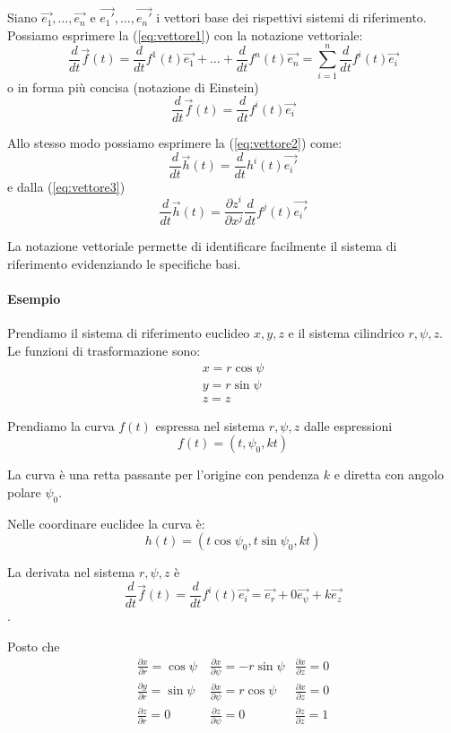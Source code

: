 \documentclass[a4paper,11pt]{article}
\begin{document}
Siano $ \vec {e_1}, \dots , \vec {e_n} $ e $ \vec {e_1'}, \dots , \vec {e_n'} $ i vettori base
dei rispettivi sistemi di riferimento. Possiamo esprimere la (\ref{eq:vettore1})
con la notazione vettoriale:
\[ \frac{d}{dt} \vec f(t) = \frac{d}{dt} f^1(t) \vec {e_1} + \dots + \frac{d}{dt} f^n(t) \vec {e_n} = \sum_{i=1}^n \frac{d}{dt} f^i(t) \vec {e_i}\]
o in forma più concisa (notazione di Einstein)
\[ \frac{d}{dt} \vec f(t) = \frac{d}{dt} f^i(t) \vec {e_i} \]

Allo stesso modo possiamo esprimere la (\ref{eq:vettore2}) come:
\[ \frac{d}{dt} \vec h(t) = \frac{d}{dt} h^i(t) \vec {e_i'} \]
e dalla (\ref{eq:vettore3})
\[ \frac{d}{dt} \vec h(t) = \frac{\partial z^i}{\partial x^j} \frac{d}{dt} f^j(t) \vec {e_i'} \]

La notazione vettoriale permette di identificare facilmente il sistema di riferimento evidenziando le specifiche basi.

\paragraph{Esempio}
Prendiamo il sistema di riferimento euclideo $ x, y, z $ e il sistema cilindrico $ r, \psi , z $.
Le funzioni di trasformazione sono:
\begin{eqnarray*}
  x = r \cos \psi
  \\
  y = r \sin \psi
  \\
  z = z
\end{eqnarray*}

Prendiamo la curva $ f(t) $ espressa nel sistema $r, \psi , z $ dalle espressioni
\[
  f(t) = ( t, \psi_0,  k t)
\]

La curva è una retta passante per l'origine con pendenza $k$ e diretta con angolo polare $ \psi_0 $.

Nelle coordinare euclidee la curva è:
\[
  h(t) = (t \cos \psi_0, t \sin \psi_0, k t )
\]

La derivata nel sistema $ r, \psi , z $ è
\[ \frac{d}{dt} \vec f(t) = \frac{d}{dt} f^i(t) \vec {e_i}
  = \vec {e_r} + 0 \vec {e_\psi} + k \vec {e_z}
\].

Posto che
\[
\begin{array}{rrr}
  \frac{\partial x}{\partial r} = \cos \psi\ & \frac{\partial x}{\partial \psi} = -r \sin \psi & \frac{\partial x}{\partial z} = 0
  \\
  \frac{\partial y}{\partial r} = \sin \psi\ & \frac{\partial x}{\partial \psi} = r \cos \psi & \frac{\partial x}{\partial z} = 0
  \\
  \frac{\partial z}{\partial r} = 0\ & \frac{\partial z}{\partial \psi} = 0 & \frac{\partial z}{\partial z} = 1
\end{array}
\]
\end{document}
